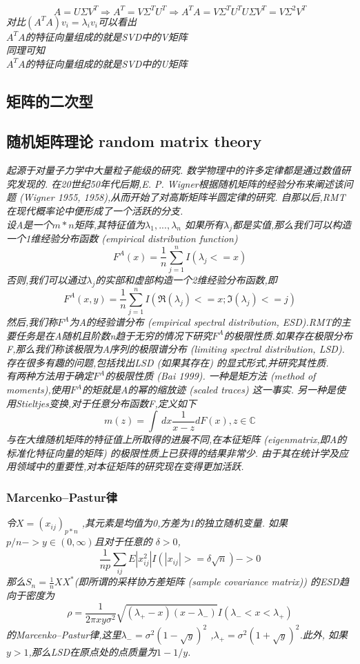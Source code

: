 \documentclass{scrartcl}
\numberwithin{equation}{section}
\begin{document}
\begin{equation}
    A = U \Sigma V^T \Rightarrow  A^T = V \Sigma ^T U^T \Rightarrow A^T A =  V \Sigma ^T U^TU \Sigma V^T = V \Sigma^2 V^T
\end{equation}
\textsl{对比$(A^T A )v_i= \lambda_i v_i $可以看出\\$A^T A $的特征向量组成的就是SVD中的V矩阵\\ 同理可知\\
    $A^T A $的特征向量组成的就是SVD中的U矩阵}





\subsection{矩阵的二次型}
\newpage


\subsection{随机矩阵理论 random matrix theory}
\textsl{起源于对量子力学中大量粒子能级的研究. 数学物理中的许多定律都是通过数值研究发现的. 在20世纪50年代后期,E. P. Wigner根据随机矩阵的经验分布来阐述该问题 (Wigner 1955, 1958),从而开始了对高斯矩阵半圆定律的研究. 自那以后,RMT在现代概率论中便形成了一个活跃的分支.\\
    设A是一个$m*n$矩阵,其特征值为$\lambda_1,...,\lambda_n$ 如果所有$\lambda_j$都是实值,那么我们可以构造一个1维经验分布函数 (empirical distribution function) $$F^A(x) =\frac{1}{n}\sum_{j=1}^nI(\lambda_j <= x)$$否则,我们可以通过$\lambda_j$的实部和虚部构造一个2维经验分布函数,即$$F^A(x, y) = \frac{1}{n}\sum_{j=1}^nI(\mathfrak{R} (\lambda_j) <= x; \mathfrak{I} (\lambda_j) <= j) $$然后,我们称$F^A$为A的经验谱分布 (empirical spectral distribution, ESD).RMT的主要任务是在A随机且阶数n趋于无穷的情况下研究$F^A$的极限性质.如果存在极限分布F,那么我们称该极限为A序列的极限谱分布 (limiting spectral distribution, LSD). 存在很多有趣的问题,包括找出LSD (如果其存在) 的显式形式,并研究其性质.\\
    有两种方法用于确定$F^A$的极限性质 (Bai 1999). 一种是矩方法 (method of moments),使用$F^A$的矩就是A的幂的缩放迹 (scaled traces) 这一事实. 另一种是使用Stieltjes变换,对于任意分布函数F,定义如下$$m(z)  = \int \,dx  \frac{1}{x-z} dF(x), z \in \mathbb{C} $$与在大维随机矩阵的特征值上所取得的进展不同,在本征矩阵 (eigenmatrix,即A的标准化特征向量的矩阵) 的极限性质上已获得的结果非常少. 由于其在统计学及应用领域中的重要性,对本征矩阵的研究现在变得更加活跃.
}
\subsubsection{Marcenko–Pastur律}
\textsl{令$X= (x_{ij})_{p*n}$ ,其元素是均值为0,方差为1的独立随机变量. 如果$p/n -> y \in (0, \infty)$且对于任意的 $\delta>0$,$$\frac{1}{np}\sum_{ij}E|x_{ij}^2|I(|x_{ij}|>=\delta\sqrt{n}) -> 0 $$那么$S_n=\frac{1}{n}XX^*$(即所谓的采样协方差矩阵 (sample covariance matrix)) 的ESD趋向于密度为$$ \rho = \frac{1}{2\pi xy \sigma^2}\sqrt{(\lambda_+-x)(x-\lambda_-)} I(\lambda_-<x<\lambda_+)$$的Marcenko–Pastur律,这里$\lambda_-= \sigma^2 (1-\sqrt{y})^2$ ,$\lambda_+= \sigma^2 (1+\sqrt{y})^2$.此外, 如果$y>1$,那么LSD在原点处的点质量为$1-1/y$.}
\end{document}
